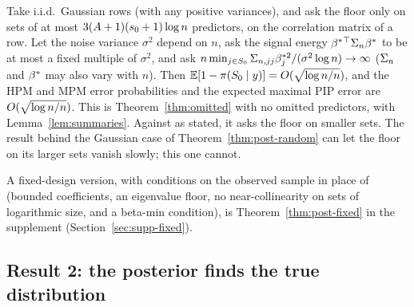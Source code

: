\begin{remark}\label{rem:thm2x}
Take i.i.d.\ Gaussian rows (with any positive variances), and ask the floor only on sets of at most
$3(A+1)(s_0+1)\log n$ predictors, on the correlation matrix of a row. Let the noise variance $\sigma^2$ depend on $n$, ask
the signal energy $\beta^*{}^\top\Sigma_n\beta^*$ to be at most a fixed multiple of $\sigma^2$, and ask
$n\min_{j\in S_0}\Sigma_{n,jj}\beta^{*2}_j/(\sigma^2\log n)\to\infty$ ($\Sigma_n$ and $\beta^*$ may also vary with $n$). Then $\operatorname{\mathbb{E}}[1-\pi(S_0\mid y)]=O(\sqrt{\log n/n})$, and the HPM and MPM error probabilities and
the expected maximal PIP error are $O(\sqrt{\log n/n})$. This is Theorem~\ref{thm:omitted} with no omitted predictors, with
Lemma~\ref{lem:summaries}. Against  as stated, it asks the floor on smaller sets. The result behind the Gaussian
case of Theorem~\ref{thm:post-random} can let the floor on its larger sets vanish slowly; this one cannot.
\end{remark}


A fixed-design version, with conditions on the observed sample in place of  (bounded coefficients, an eigenvalue
floor, no near-collinearity on sets of logarithmic size, and a beta-min condition), is Theorem~\ref{thm:post-fixed} in the
supplement (Section~\ref{sec:supp-fixed}).

\subsection{Result 2: the posterior finds the true distribution}\label{sec:distribution}


